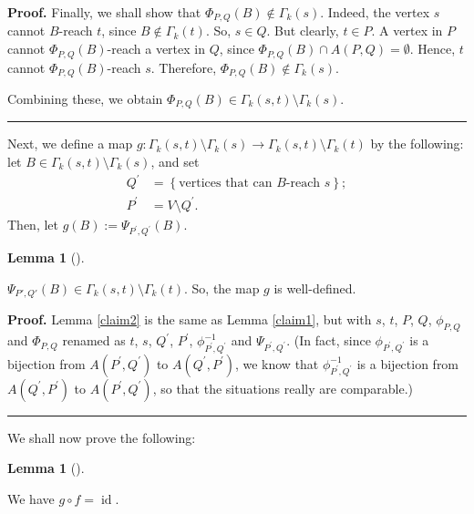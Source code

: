 \documentclass[numbers=enddot,12pt,final,onecolumn,notitlepage]{scrartcl}%
\theoremstyle{definition}
\newtheorem{lem}[theo]{Lemma}
\newenvironment{lemma}[1][]
{\begin{lem}[#1]\begin{leftbar}}
{\end{leftbar}\end{lem}}
\newenvironment{proof}[1][Proof]{\noindent\textbf{#1.} }{\ \rule{0.5em}{0.5em}}
\theoremstyle{plainsl}
\begin{document}
\begin{proof}
    Finally, we shall show that $\Phi_{P,Q}\left(  B\right)  \notin\Gamma
    _{k}\left(  s\right)  $. Indeed, the vertex $s$ cannot $B$-reach $t$, since $B \notin \Gamma_{k}(t)$. So, $s \in Q$. But clearly, $t \in P$. A vertex in $P$ cannot $\Phi_{P,Q}(B)$-reach a vertex in $Q$, since $\Phi_{P,Q}(B) \cap A(P,Q) = \emptyset$. Hence, $t$ cannot $\Phi_{P,Q}(B)$-reach $s$. Therefore, $\Phi_{P,Q}(B) \notin \Gamma_{k}(s)$.
    
    Combining these, we obtain $\Phi_{P,Q}\left(  B\right)  \in\Gamma_{k}\left(
    s,t\right)  \setminus\Gamma_{k}\left(  s\right)  $.
\end{proof}

Next, we define a map $g: \Gamma_{k}(s,t) \setminus \Gamma_{k}(s) \to \Gamma_{k}(s,t) \setminus \Gamma_{k}(t)$ by the following: let $B \in \Gamma_{k}(s,t) \setminus \Gamma_{k}(s)$, and set%
\begin{align*}
Q^{\prime}  &  =\left\{  \text{vertices that can }B\text{-reach }s\right\}
;\\
P^{\prime}  &  =V\setminus Q^{\prime}.
\end{align*}
Then, let $g\left(  B\right)  :=\Psi_{P^{\prime},Q^{\prime}}\left(  B\right)
$.

\begin{lemma}
\label{claim2}
    $\Psi_{P',Q'}(B) \in  \Gamma_{k}(s,t) \setminus \Gamma_{k}(t)$. So, the map $g$ is well-defined.
\end{lemma}

\begin{proof}
    Lemma \ref{claim2} is the same as Lemma \ref{claim1}, but with $s$, $t$, $P$,
$Q$, $\phi_{P,Q}$ and $\Phi_{P,Q}$ renamed as $t$, $s$, $Q^{\prime}$,
$P^{\prime}$, $\phi_{P^{\prime},Q^{\prime}}^{-1}$ and $\Psi_{P^{\prime
},Q^{\prime}}$. (In fact, since $\phi_{P^{\prime},Q^{\prime}}$ is a bijection
from $A\left(  P^{\prime},Q^{\prime}\right)  $ to $A\left(  Q^{\prime
},P^{\prime}\right)  $, we know that $\phi_{P^{\prime},Q^{\prime}}^{-1}$ is a
bijection from $A\left(  Q^{\prime},P^{\prime}\right)  $ to $A\left(
P^{\prime},Q^{\prime}\right)  $, so that the situations really are comparable.)
\end{proof}

We shall now prove the following:
\begin{lemma}
\label{claim3}
    We have $g\circ f=\operatorname*{id}$.
\end{lemma}
\end{document}
